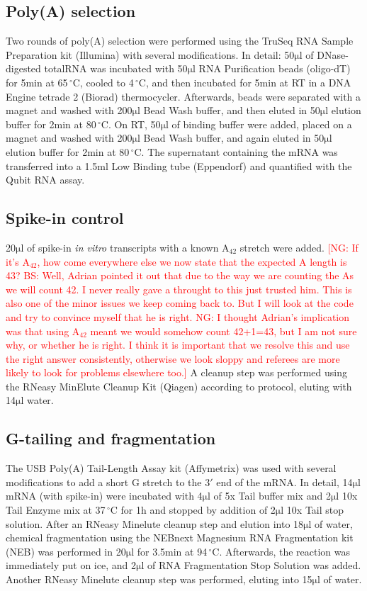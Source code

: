 \documentclass[10pt]{article}
\newcommand{\note}[1]{\textcolor{red}{[#1]}}  %
\newcommand{\mul}{\ensuremath{\mathrm{\mu l}}}
\newcommand{\C}{\,$^{\circ}\mathrm{C}$}
\begin{document}
\subsection*{Poly(A) selection}

Two rounds of poly(A) selection were performed using the TruSeq RNA Sample Preparation kit (Illumina) with several modifications. In detail: 50{\mul} of DNase-digested totalRNA was incubated with 50{\mul} RNA Purification beads (oligo-dT) for 5min at 65{\C}, cooled to 4{\C}, and then incubated for 5min at RT in a DNA Engine tetrade 2 (Biorad) thermocycler. Afterwards, beads were separated with a magnet and washed with 200{\mul} Bead Wash buffer, and then eluted in 50{\mul} elution buffer for 2min at 80{\C}. On RT, 50{\mul} of binding buffer were added, placed on a magnet and washed with 200{\mul} Bead Wash buffer, and again eluted in 50{\mul} elution buffer for 2min at 80{\C}. The supernatant containing the mRNA was transferred into a 1.5ml Low Binding tube (Eppendorf) and quantified with the Qubit RNA assay.

\subsection*{Spike-in control}

20{\mul} of spike-in \textit{in vitro} transcripts with a known A$_{42}$ stretch \cite{pelechano13} were added. 
\note{NG: If it's A$_{42}$, how come everywhere else we now state that the expected A length is 43? BS: Well, Adrian pointed it out that due to the way we are counting the As we will count 42. I never really gave a throught to this just trusted him. This is also one of the minor issues we keep coming back to. But I will look at the code and try to convince myself that he is right. NG: I thought Adrian's implication was that using A$_{42}$ meant we would somehow count 42+1=43, but I am not sure why, or whether he is right. I think it is important that we resolve this and use the right answer consistently, otherwise we look sloppy and referees are more likely to look for problems elsewhere too.}
A cleanup step was performed using the RNeasy MinElute Cleanup Kit (Qiagen) according to protocol, eluting with 14{\mul} water.

\subsection*{G-tailing and fragmentation}

The USB Poly(A) Tail-Length Assay kit (Affymetrix) was used with several modifications to add a short G stretch to the $3'$ end of the mRNA. In detail, 14{\mul} mRNA (with spike-in) were incubated with 4{\mul} of 5x Tail buffer mix and 2{\mul} 10x Tail Enzyme mix at 37{\C} for 1h and stopped by addition of 2{\mul} 10x Tail stop solution. After an RNeasy Minelute cleanup step and elution into 18{\mul} of water, chemical fragmentation using the NEBnext Magnesium RNA Fragmentation kit (NEB) was performed in 20{\mul} for 3.5min at 94{\C}. Afterwards, the reaction was immediately put on ice, and 2{\mul} of RNA Fragmentation Stop Solution was added. Another RNeasy Minelute cleanup step was performed, eluting into 15{\mul} of water.
\end{document}

